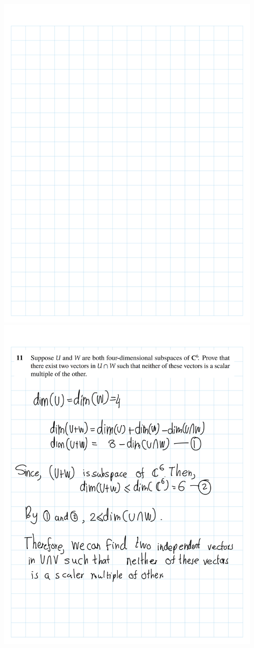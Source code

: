 \documentclass[
]{book}
\theoremstyle{definition}
\theoremstyle{definition}
\theoremstyle{definition}
\theoremstyle{definition}
\theoremstyle{remark}
\begin{document}
\includegraphics{fig/Ex 2B and 2C/Ex 2c (40).png}
\includegraphics{fig/Ex 2B and 2C/Ex 2c (41).png}
\end{document}
